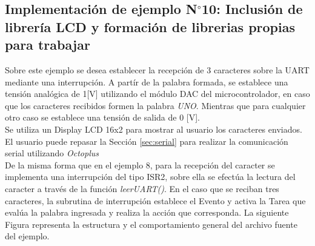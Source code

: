 \documentclass[12pt,letterpaper]{article}
\begin{document}
\subsection{Implementación de ejemplo N$^{\circ}$10: Inclusión de librería LCD y formación de librerias propias para trabajar}

Sobre este ejemplo se desea establecer la recepción de 3 caracteres sobre la UART mediante una interrupción. A partír de la palabra formada, se establece una tensión analógica de 1[V] utilizando el módulo DAC del microcontrolador, en caso que los caracteres recibidos formen la palabra \textit{UNO}. Mientras que para cualquier otro caso se establece una tensión de salida de 0 [V].
 \\
 
Se utiliza un Display LCD 16x2 para mostrar al usuario los caracteres enviados. El usuario puede repasar la Sección \ref{sec:serial} para realizar la comunicación serial utilizando \textit{Octoplus}
 \\
 
De la misma forma que en el ejemplo 8, para la recepción del caracter se implementa una interrupción del tipo ISR2, sobre ella se efectúa la lectura del caracter a través de la función \textit{leerUART()}. En el caso que se reciban tres caracteres, la subrutina de interrupción establece el Evento y activa la Tarea que evalúa la palabra ingresada y realiza la acción que corresponda. La siguiente Figura representa la estructura y el comportamiento general del archivo fuente del ejemplo.
\end{document}
